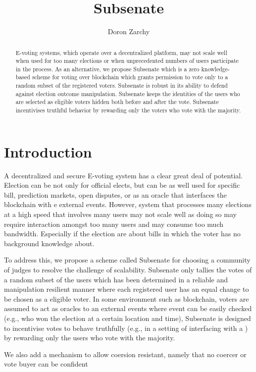 \documentclass[]{paper}
\title{Subsenate}
\author{Doron Zarchy}
\begin{document}
\maketitle 

\begin{abstract}
E-voting systems, which operate over a decentralized platform, may not scale well when used for too many elections or when unprecedented numbers of users participate in the process. 
As an alternative, we propose Subsenate which is a zero knowledge-based scheme for voting over blockchain which grants permission to vote only to a random subset of the registered voters. Subsenate is robust in its ability to defend against election outcome manipulation. Subsenate keeps the identities of the users who are selected as eligible voters hidden both before and after the vote. Subsenate incentivises truthful behavior by rewarding only the voters who vote with the majority.
\end{abstract}

\section{Introduction}
A decentralized and secure E-voting system has a clear great deal of potential. Election can be not only for official elects, but can be as well used for specific bill, prediction markets, open disputes, or as an oracle that interfaces the blockchain with e external events.
However,  system that processes many elections at a high speed that involves many users may not scale well as doing so may require interaction amongst too many users and may consume too much bandwidth. 
Especially if the election are about bills in which the voter has no background knowledge about.

To address this, we propose a scheme called Subsenate for choosing a community of judges to resolve the challenge of scalability. Subsenate only tallies the votes of a random subset of the users which has been determined in a reliable and manipulation resilient manner where each registered user has an equal change to be chosen as a eligible voter. In some environment such as blockchain, voters are assumed to act as oracles to an external events where event can be easily checked (e.g., who won the election at a certain location and time),  Subsenate is designed  to incentivise votes to behave truthfully (e.g., in a setting of interfacing with a ) by rewarding only the users who vote with the majority.

We also add a mechanism to allow coersion resistant, namely that no coercer or vote buyer can be confident 
\end{document}
